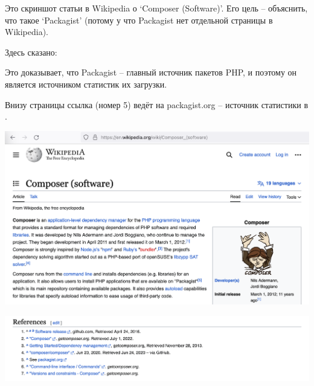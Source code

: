 
Это скриншот статьи в Wikipedia о `Composer (Software)'.
Его цель -- объяснить, что такое `Packagist'
(потому у что Packagist нет отдельной страницы в Wikipedia).

Здесь сказано:


Это доказывает, что Packagist -- главный источник пакетов PHP,
и поэтому он является источником статистик их загрузки.

Внизу страницы ссылка (номер 5) ведёт на packagist.org --
источник статистики в .

\includegraphics[width=\textwidth]{packagist-wikipedia-p1}

\pagebreak

\includegraphics[width=\textwidth]{packagist-wikipedia-bottom}

\pagebreak




